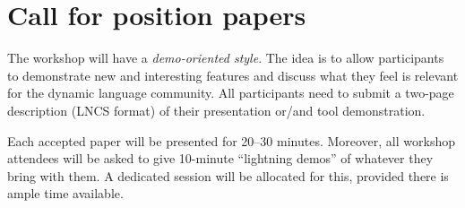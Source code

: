 \documentclass[runningheads]{llncs}
\begin{document}

\section{Call for position papers}

The workshop will have a \emph{demo-oriented style}. The idea is to allow participants to demonstrate new and interesting features and discuss what they feel is relevant for the dynamic language community. All participants need to submit a two-page description (LNCS format) of their presentation or/and tool demonstration. 

Each accepted paper will be presented for 20--30 minutes. Moreover, all workshop attendees will be asked to give 10-minute ``lightning demos'' of whatever they bring with them. A dedicated session will be allocated for this, provided there is ample time available.

\end{document}
